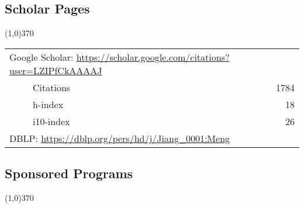 \documentclass[10pt]{article}
\begin{document}
\vspace{-0.6cm}
\subsection{\sc Scholar Pages}
\vspace{-0.4cm} \line(1,0){370} \vspace{-0.1cm}

\begin{table}[h!]
\begin{tabular*}{12.7cm}{p{11.65cm}r}
\multicolumn{2}{l}{Google Scholar: \url{https://scholar.google.com/citations?user=LZIPfCkAAAAJ}} \\
~~~~~Citations&1784 \\
~~~~~h-index&18 \\
~~~~~i10-index&26 \\
\multicolumn{2}{l}{DBLP: \url{https://dblp.org/pers/hd/j/Jiang\_0001:Meng}} \\
\end{tabular*}
\end{table}

\subsection{\sc Sponsored Programs}
\vspace{-0.4cm} \line(1,0){370} \vspace{-0.1cm}
\end{document}
